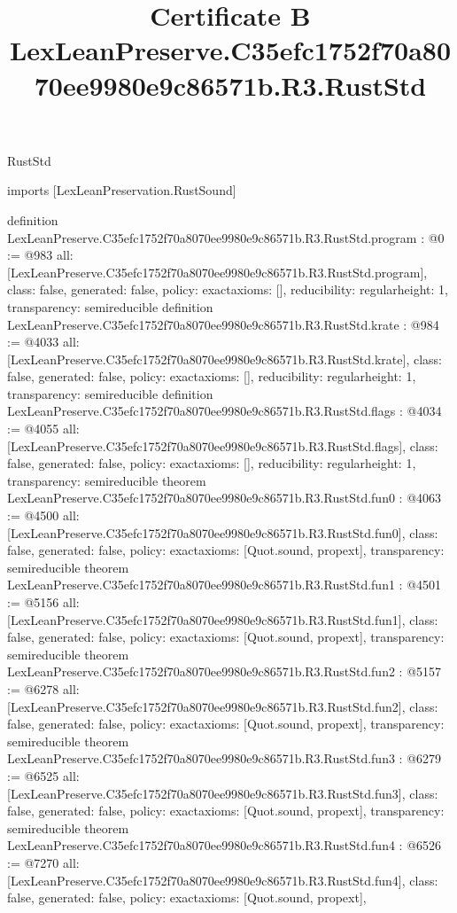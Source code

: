 \begin{lexlean}{RustStd}
\title{Certificate B LexLeanPreserve.C35efc1752f70a8070ee9980e9c86571b.R3.RustStd}
\begin{coremodule}
imports [LexLeanPreservation.RustSound]

definition LexLeanPreserve.C35efc1752f70a8070ee9980e9c86571b.R3.RustStd.program : @0 := @983 {
  all: [LexLeanPreserve.C35efc1752f70a8070ee9980e9c86571b.R3.RustStd.program],
  class: false,
  generated: false,
  policy: exact{axioms: []},
  reducibility: regular{height: 1},
  transparency: semireducible
}
definition LexLeanPreserve.C35efc1752f70a8070ee9980e9c86571b.R3.RustStd.krate : @984 := @4033 {
  all: [LexLeanPreserve.C35efc1752f70a8070ee9980e9c86571b.R3.RustStd.krate],
  class: false,
  generated: false,
  policy: exact{axioms: []},
  reducibility: regular{height: 1},
  transparency: semireducible
}
definition LexLeanPreserve.C35efc1752f70a8070ee9980e9c86571b.R3.RustStd.flags : @4034 := @4055 {
  all: [LexLeanPreserve.C35efc1752f70a8070ee9980e9c86571b.R3.RustStd.flags],
  class: false,
  generated: false,
  policy: exact{axioms: []},
  reducibility: regular{height: 1},
  transparency: semireducible
}
theorem LexLeanPreserve.C35efc1752f70a8070ee9980e9c86571b.R3.RustStd.fun0 : @4063 := @4500 {
  all: [LexLeanPreserve.C35efc1752f70a8070ee9980e9c86571b.R3.RustStd.fun0],
  class: false,
  generated: false,
  policy: exact{axioms: [Quot.sound, propext]},
  transparency: semireducible
}
theorem LexLeanPreserve.C35efc1752f70a8070ee9980e9c86571b.R3.RustStd.fun1 : @4501 := @5156 {
  all: [LexLeanPreserve.C35efc1752f70a8070ee9980e9c86571b.R3.RustStd.fun1],
  class: false,
  generated: false,
  policy: exact{axioms: [Quot.sound, propext]},
  transparency: semireducible
}
theorem LexLeanPreserve.C35efc1752f70a8070ee9980e9c86571b.R3.RustStd.fun2 : @5157 := @6278 {
  all: [LexLeanPreserve.C35efc1752f70a8070ee9980e9c86571b.R3.RustStd.fun2],
  class: false,
  generated: false,
  policy: exact{axioms: [Quot.sound, propext]},
  transparency: semireducible
}
theorem LexLeanPreserve.C35efc1752f70a8070ee9980e9c86571b.R3.RustStd.fun3 : @6279 := @6525 {
  all: [LexLeanPreserve.C35efc1752f70a8070ee9980e9c86571b.R3.RustStd.fun3],
  class: false,
  generated: false,
  policy: exact{axioms: [Quot.sound, propext]},
  transparency: semireducible
}
theorem LexLeanPreserve.C35efc1752f70a8070ee9980e9c86571b.R3.RustStd.fun4 : @6526 := @7270 {
  all: [LexLeanPreserve.C35efc1752f70a8070ee9980e9c86571b.R3.RustStd.fun4],
  class: false,
  generated: false,
  policy: exact{axioms: [Quot.sound, propext]},
}
\end{coremodule}
\end{lexlean}
